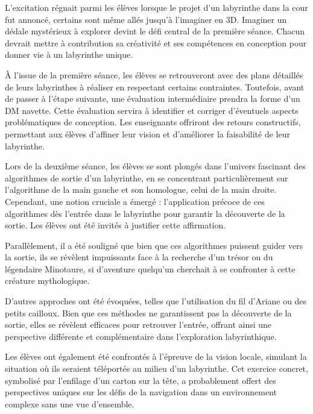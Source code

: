 

L'excitation régnait parmi les élèves lorsque le projet d'un labyrinthe dans la cour fut annoncé, certains sont même allés jusqu'à l'imaginer en 3D.
Imaginer un dédale mystérieux à explorer devint le défi central de la première séance. Chacun devrait mettre à contribution sa créativité
et ses compétences en conception pour donner vie à un labyrinthe unique.

À l'issue de la première séance, les élèves se retrouveront avec des plans détaillés de leurs labyrinthes à réaliser en respectant certains contraintes.
Toutefois, avant de passer à l'étape suivante, une évaluation intermédiaire prendra la forme d'un DM navette. Cette évaluation servira
à identifier et corriger d'éventuels aspects problématiques de conception. Les enseignants offriront des retours constructifs, permettant
aux élèves d'affiner leur vision et d'améliorer la faisabilité de leur labyrinthe.

Lors de la deuxième séance, les élèves se sont plongés dans l'univers fascinant des algorithmes de sortie d'un labyrinthe,
en se concentrant particulièrement sur l'algorithme de la main gauche et son homologue, celui de la main droite. 
Cependant, une notion cruciale a émergé : l'application précoce de ces algorithmes dès l'entrée dans le labyrinthe pour
garantir la découverte de la sortie. Les élèves ont été invités à justifier cette affirmation.

Parallèlement, il a été souligné que bien que ces algorithmes puissent guider vers la sortie, ils se révèlent impuissants face à la recherche d'un trésor ou du légendaire Minotaure, si d'aventure quelqu'un cherchait à se confronter à cette créature mythologique.

D'autres approches ont été évoquées, telles que l'utilisation du fil d'Ariane ou des petits cailloux. Bien que ces méthodes ne garantissent pas la découverte de la sortie, elles se révèlent efficaces pour retrouver l'entrée, offrant ainsi une perspective différente et complémentaire dans l'exploration labyrinthique.

Les élèves ont également été confrontés à l'épreuve de la vision locale, simulant la situation où ils seraient téléportés au milieu d'un labyrinthe. Cet exercice concret, symbolisé par l'enfilage d'un carton sur la tête, a probablement offert des perspectives uniques sur les défis de la navigation dans un environnement complexe sans une vue d'ensemble.

